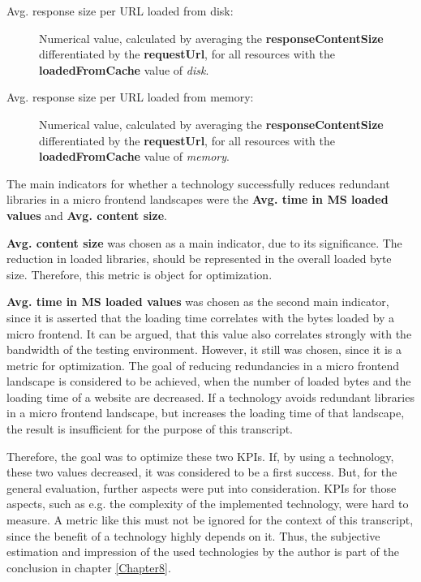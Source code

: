 \begin{description}
	\item[Avg. response size per URL loaded from disk:] Numerical value, calculated by averaging the \textbf{responseContentSize} differentiated by the \textbf{requestUrl}, for all resources with the \textbf{loadedFromCache} value of \textit{disk}.
	
	\item[Avg. response size per URL loaded from memory:] Numerical value, calculated by averaging the \textbf{responseContentSize} differentiated by the \textbf{requestUrl}, for all resources with the \textbf{loadedFromCache} value of \textit{memory}.
\end{description}

The main indicators for whether a technology successfully reduces redundant libraries in a micro frontend landscapes were the \textbf{Avg. time in MS loaded values} and \textbf{Avg. content size}.

\textbf{Avg. content size} was chosen as a main indicator, due to its significance. The reduction in loaded libraries, should be represented in the overall loaded byte size. Therefore, this metric is object for optimization.

\textbf{Avg. time in MS loaded values} was chosen as the second main indicator, since it is asserted that the loading time correlates with the bytes loaded by a micro frontend. It can be argued, that this value also correlates strongly with the bandwidth of the testing environment. However, it still was chosen, since it is a metric for optimization. The goal of reducing redundancies in a micro frontend landscape is considered to be achieved, when the number of loaded bytes and the loading time of a website are decreased.
If a technology avoids redundant libraries in a micro frontend landscape, but increases the loading time of that landscape, the result is insufficient for the purpose of this transcript.

Therefore, the goal was to optimize these two KPIs. If, by using a technology, these two values decreased, it was considered to be a first success. 
But, for the general evaluation, further aspects were put into consideration. 
KPIs for those aspects, such as e.g. the complexity of the implemented technology, were hard to measure.  
A metric like this must not be ignored for the context of this transcript, since the benefit of a technology highly depends on it.
Thus, the subjective estimation and impression of the used technologies by the author is part of the conclusion in chapter \ref{Chapter8}.

